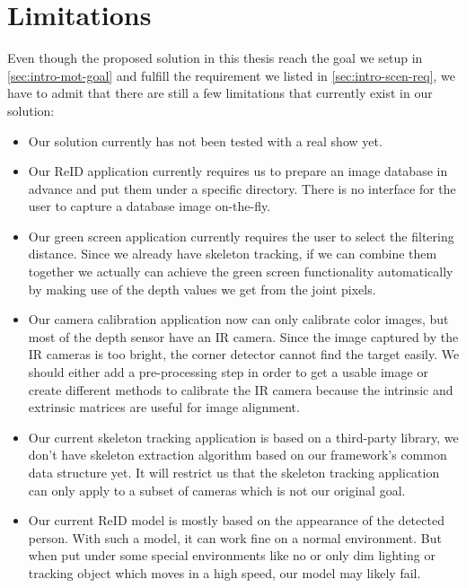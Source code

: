 \section{Limitations}
\label{sec:Conclusion-limitation}

Even though the proposed solution in this thesis reach the goal we setup in
\autoref{sec:intro-mot-goal} and fulfill the requirement we listed in
\autoref{sec:intro-scen-req}, we have to admit that there are still a few
limitations that currently exist in our solution:

\begin{itemize}
    \item Our solution currently has not been tested with a real show yet.
    
	\item Our ReID application currently requires us to prepare an image database
	in advance and put them under a specific directory. There is no interface
	for the user to capture a database image on-the-fly.

	\item Our green screen application currently requires the user to select the
	filtering distance. Since we already have skeleton tracking, if we can
	combine them together we actually can achieve the green screen functionality automatically by
	making use of the depth values we get from the joint pixels.

	\item Our camera calibration application now can only calibrate color
	images, but most of the depth sensor have an IR camera. Since the image
	captured by the IR cameras is too bright, the corner detector cannot
	find the target easily. We should either add a pre-processing step in order
	to get a usable image or create different methods to calibrate the IR camera
	because the intrinsic and extrinsic matrices are useful for image alignment.

	\item Our current skeleton tracking application is based on a third-party
	library, we don't have skeleton extraction algorithm based on our
	framework's common data structure yet. It will restrict us that the
	skeleton tracking application can only apply to a subset of cameras which
	is not our original goal.

	\item Our current ReID model is mostly based on the appearance of the detected
	person. With such a model, it can work fine on a normal environment. But
	when put under some special environments like no or only dim lighting or
	tracking object which moves in a high speed, our model may likely fail.


\end{itemize}
